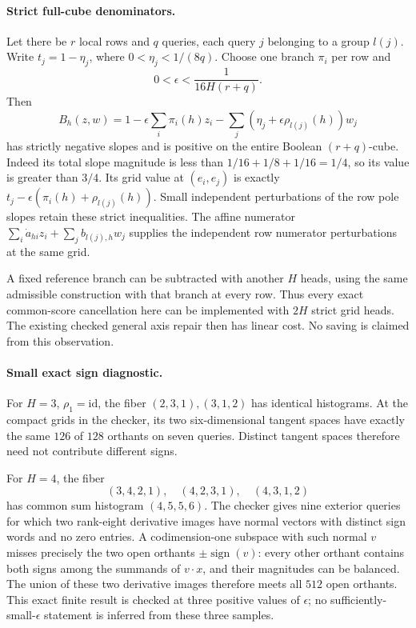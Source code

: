 \documentclass[11pt]{article}
\begin{document}
\paragraph{Strict full-cube denominators.}
Let there be $r$ local rows and $q$ queries, each query $j$ belonging
to a group $l(j)$. Write $t_j=1-\eta_j$, where
$0<\eta_j<1/(8q)$. Choose one branch $\pi_i$ per row and
\[
 0<\epsilon<\frac1{16H(r+q)}.
\]
Then
\[
 B_h(z,w)=1-\epsilon\sum_i\pi_i(h)z_i
       -\sum_j(\eta_j+\epsilon\rho_{l(j)}(h))w_j
\]
has strictly negative slopes and is positive on the entire Boolean
$(r+q)$-cube. Indeed its total slope magnitude is less than
$1/16+1/8+1/16=1/4$, so its value is greater than $3/4$.
Its grid value at $(e_i,e_j)$ is exactly
$t_j-\epsilon(\pi_i(h)+\rho_{l(j)}(h))$.
Small independent perturbations of the row pole slopes retain these
strict inequalities. The affine numerator
$\sum_i\dot a_{hi}z_i+\sum_jb_{l(j),h}w_j$ supplies the independent
row numerator perturbations at the same grid.

A fixed reference branch can be subtracted with another $H$ heads,
using the same admissible construction with that branch at every row.
Thus every exact common-score cancellation here can be implemented
with $2H$ strict grid heads. The existing checked general axis repair
then has linear cost. No saving is claimed from this observation.

\paragraph{Small exact sign diagnostic.}
For $H=3$, $\rho_1=\mathrm{id}$, the fiber
$(2,3,1),(3,1,2)$ has identical histograms. At the compact grids in the
checker, its two six-dimensional tangent spaces have exactly the same
$126$ of $128$ orthants on seven queries. Distinct tangent spaces
therefore need not contribute different signs.

For $H=4$, the fiber
\[
 (3,4,2,1),\quad(4,2,3,1),\quad(4,3,1,2)
\]
has common sum histogram $(4,5,5,6)$. The checker gives nine exterior
queries for which two rank-eight derivative images have normal vectors
with distinct sign words and no zero entries. A codimension-one
subspace with such normal $v$ misses precisely the two open orthants
$\pm\operatorname{sign}(v)$: every other orthant contains both signs
among the summands of $v\cdot x$, and their magnitudes can be balanced.
The union of these two derivative images therefore meets all $512$
open orthants. This exact finite result is checked at three positive
values of $\epsilon$; no sufficiently-small-$\epsilon$ statement is
inferred from these three samples.
\end{document}

